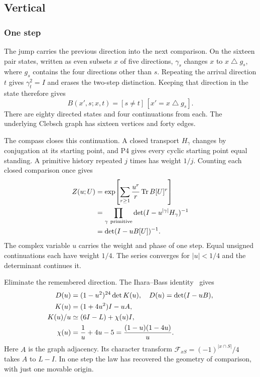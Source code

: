 \documentclass[aps,prx,reprint,longbibliography]{revtex4-2}
\providecommand{\Tr}{\operatorname{Tr}}
\begin{document}
\subsection{Vertical}
\label{sec:vertical}
\setcounter{subsubsection}{0}
\renewcommand{\thesubsubsection}{\arabic{subsubsection}}

\subsubsection{One step}
\label{sec:one_step}

The jump carries the previous direction into the next comparison. On the sixteen pair states, written as even subsets $x$ of five directions, $\gamma_s$ changes $x$ to $x\mathbin\triangle g_s$, where $g_s$ contains the four directions other than $s$. Repeating the arrival direction $t$ gives $\gamma_t^2=I$ and erases the two-step distinction. Keeping that direction in the state therefore gives
\begin{equation}
 B(x',s;x,t)=[s\ne t]\,[x'=x\mathbin\triangle g_s].
 \label{eq:B}
\end{equation}
There are eighty directed states and four continuations from each. The underlying Clebsch graph has sixteen vertices and forty edges.

The compass closes this continuation. A closed transport $H_\gamma$ changes by conjugation at its starting point, and P4 gives every cyclic starting point equal standing. A primitive history repeated $j$ times has weight $1/j$. Counting each closed comparison once gives
\begin{equation}
 \begin{split}
 Z(u;U)&=\exp\!\left[\sum_{r\ge1}\frac{u^r}{r}\Tr B[U]^r\right]\\
 &=\prod_{\gamma\ {\rm primitive}}\det(I-u^{|\gamma|}H_\gamma)^{-1}\\
 &=\det(I-uB[U])^{-1}.
 \end{split}
 \label{eq:law}
\end{equation}
The complex variable $u$ carries the weight and phase of one step. Equal unsigned continuations each have weight $1/4$. The series converges for $|u|<1/4$ and the determinant continues it.

Eliminate the remembered direction. The Ihara--Bass identity~\cite{Ihara,Bass,Hashimoto} gives
\begin{align}
 D(u)&=(1-u^2)^{24}\det K(u),\quad D(u)=\det(I-uB),\notag\\
 K(u)&=(1+4u^2)I-uA,\label{eq:bass}\\
 K(u)/u&\simeq(6I-L)+\chi(u)I,\notag\\
 \chi(u)&=\frac1u+4u-5=\frac{(1-u)(1-4u)}u.\label{eq:chi}
\end{align}
Here $A$ is the graph adjacency. Its character transform $\mathscr F_{xS}=(-1)^{|x\cap S|}/4$ takes $A$ to $L-I$. In one step the law has recovered the geometry of comparison, with just one movable origin.
\end{document}
